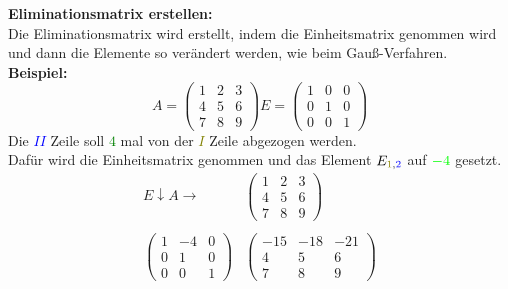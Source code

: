 \documentclass[12pt,a4paper]{article}
\begin{document}
\textbf{Eliminationsmatrix erstellen:} \\
Die Eliminationsmatrix wird erstellt, indem die Einheitsmatrix genommen wird und dann die Elemente so verändert werden, wie beim Gauß-Verfahren. \\
\textbf{Beispiel:}
\[
A =
\begin{pmatrix}
    1 & 2 & 3 \\
    4 & 5 & 6 \\
    7 & 8 & 9
\end{pmatrix}
E =
\begin{pmatrix}
1 & 0 & 0 \\
0 & 1 & 0 \\
0 & 0 & 1
\end{pmatrix}
\]
Die \textcolor{blue}{$II$} Zeile soll \textcolor{green}{$4$} mal von der \textcolor{olive}{$I$} Zeile abgezogen werden. \\
Dafür wird die Einheitsmatrix genommen und das Element $E_{\textcolor{olive}{1},\textcolor{blue}{2}}$ auf $\textcolor{green}{-4}$ gesetzt. \\
\[
\begin{matrix}
    E \downarrow A \rightarrow & \begin{pmatrix}
        1 & 2 & 3 \\
        4 & 5 & 6 \\
        7 & 8 & 9
    \end{pmatrix} \\ \\
    \begin{pmatrix}
        1 & -4 & 0 \\
        0 & 1 & 0 \\
        0 & 0 & 1
    \end{pmatrix} & \begin{pmatrix}
        -15 & -18 & -21 \\
        4 & 5 & 6 \\
        7 & 8 & 9
    \end{pmatrix}
\end{matrix}
\]
\end{document}
